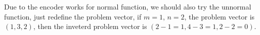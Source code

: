 \documentclass[conference,letterpaper]{IEEEtran}
\begin{document}
Due to the encoder works for normal function, we should also try the unnormal function, just redefine the problem vector, if $m = 1$, $n = 2$, the problem vector is $(1,3,2)$, then the inveterd problem vector is $(2-1=1, 4-3=1, 2-2=0)$.



%
\end{document}
